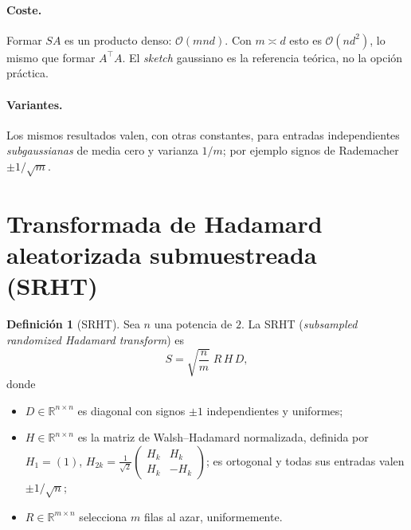 \documentclass[11pt,a4paper,oneside]{book}
\theoremstyle{definition}
\newtheorem{definicion}[teorema]{Definición}
\theoremstyle{remark}
\newcommand{\R}{\mathbb{R}}
\newcommand{\cO}{\mathcal{O}}
\newcommand{\T}{^{\top}}
\begin{document}
\paragraph{Coste.} Formar $SA$ es un producto denso: $\cO(mnd)$. Con $m\asymp d$ esto es $\cO(nd^2)$, lo mismo
que formar $A\T A$. El \emph{sketch} gaussiano es la referencia teórica, no la opción práctica.

\paragraph{Variantes.} Los mismos resultados valen, con otras constantes, para entradas independientes
\emph{subgaussianas} de media cero y varianza $1/m$; por ejemplo signos de Rademacher $\pm1/\sqrt m$.

\section{Transformada de Hadamard aleatorizada submuestreada (SRHT)}

\begin{definicion}[SRHT]\label{def:srht}
Sea $n$ una potencia de $2$. La SRHT (\emph{subsampled randomized Hadamard transform}) es
\[ S=\sqrt{\frac{n}{m}}\;R\,H\,D, \]
donde
\begin{itemize}
  \item $D\in\R^{n\times n}$ es diagonal con signos $\pm1$ independientes y uniformes;
  \item $H\in\R^{n\times n}$ es la matriz de Walsh--Hadamard normalizada, definida por
        $H_1=(1)$, $H_{2k}=\frac{1}{\sqrt2}\begin{pmatrix}H_k&H_k\\H_k&-H_k\end{pmatrix}$; es ortogonal y todas sus entradas valen $\pm1/\sqrt n$;
  \item $R\in\R^{m\times n}$ selecciona $m$ filas al azar, uniformemente.
\end{itemize}
\end{definicion}
\end{document}
